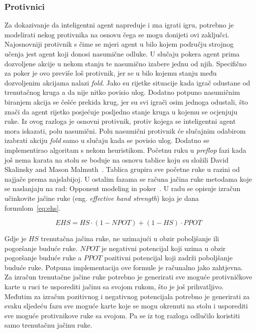 \subsubsection{Protivnici}
Za dokazivanje da inteligentni agent napreduje i zna igrati igru, potrebno je modelirati nekog protivnika na osnovu čega se mogu donijeti ovi zaključci. Najosnovniji protivnik s čime se mjeri agent u bilo kojem području strojnog učenja jest agent koji donosi nasumične odluke. U slučaju pokera agent prima dozvoljene akcije u nekom stanju te nasumično izabere jednu od njih. Specifično za poker je ovo previše loš protivnik, jer se u bilo kojemu stanju među dozvoljenim akcijama nalazi \textit{fold}. Jako su rijetke situacije kada igrač odustane od trenutačnog kruga a da nije nitko povisio ulog. Dodatno potpuno nasumičnim biranjem akcija se češće prekida krug, jer su svi igrači osim jednoga odustali, što znači da agent rijetko posjećuje posljedno stanje kruga u kojemu se ocjenjuju ruke. Iz ovog razloga je osnovni protivnik, protiv kojega se inteligentni agent mora iskazati, polu nasumični. Polu nasumični protivnik će slučajnim odabirom izabrati akciju \textit{fold} samo u slučaju kada se povisio ulog. Dodatno se implementirao algoritam s nekom heuristikom. Početnu ruku u \textit{preflop} fazi kada još nema karata na stolu se boduje na osnovu tablice koju su složili David Skalinsky and Mason Malmuth~\cite{starting_hand_groups}. Tablica grupira sve početne ruke u razini od najjače prema najslabijoj. U ostalim fazama se računa jačina ruke metodama koje se naslanjaju na rad: Opponent modeling in poker~\cite{EHS}. U radu se opisuje izračun učinkovite jačine ruke (eng. \textit{effective hand strength}) koja je dana formulom~\ref{eq:ehs}.

\begin{equation}\label{eq:ehs}
EHS = HS \cdot (1 - NPOT) + (1 - HS) \cdot PPOT
\end{equation}

Gdje je $HS$ trenutačna jačina ruke, ne uzimajući u obzir poboljšanje ili pogoršanje buduće ruke. $NPOT$ je negativni potencijal koji uzima u obzir pogoršanje buduće ruke a $PPOT$ pozitivni potencijal koji zadrži poboljšanje buduće ruke. Potpuna implementacija ove formule je računalno jako zahtjevna. Za izračun trenutačne jačine ruke potrebno je generirati sve moguće protivničkove karte u ruci te usporediti jačinu sa svojom rukom, što je još prihvatljivo. Međutim za izračun pozitivnog i negativnog potencijala potrebno je generirati za svaku sljedeću fazu sve moguće karte koje se mogu okrenuti na stolu i usporediti sve moguće protivnikove ruke sa svojom. Pa se iz tog razloga odlučilo koristiti samo trenutačnu jačinu ruke.


